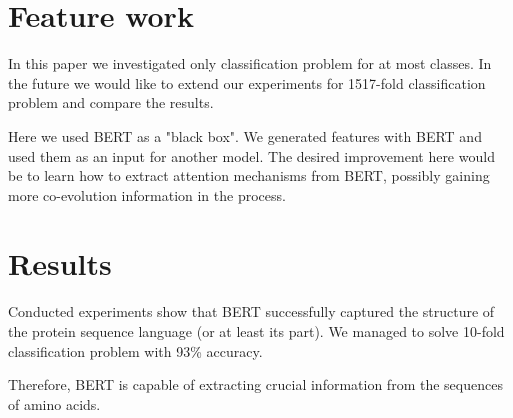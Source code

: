 \documentclass[12pt, twoside]{article}
\begin{document}
\section{Feature work}
In this paper we investigated only classification problem for at most classes. In the future we would like to extend our experiments for 1517-fold classification problem and compare the results.

Here we used BERT as a "black box". We generated features with BERT and used them as an input for another model. The desired improvement here would be to learn how to extract attention mechanisms from BERT, possibly gaining more co-evolution information in the process.


\section{Results}
\noindent

Conducted experiments show that BERT successfully captured the structure of the protein sequence language (or at least its part). We managed to solve 10-fold classification problem with 93\% accuracy.

Therefore, BERT is capable of extracting crucial information from the sequences of amino acids.










\end{document}
